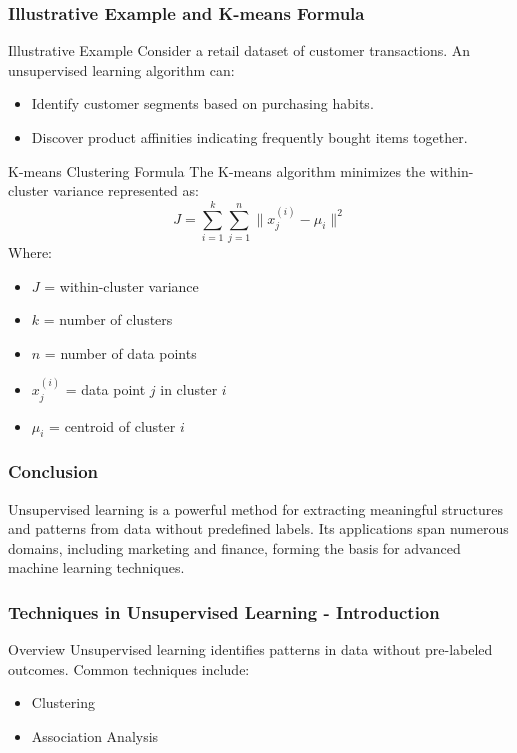 \documentclass[aspectratio=169]{beamer}
\begin{document}
\begin{frame}[fragile]
    \frametitle{Illustrative Example and K-means Formula}
    
    \begin{block}{Illustrative Example}
        Consider a retail dataset of customer transactions. An unsupervised learning algorithm can:
        \begin{itemize}
            \item Identify customer segments based on purchasing habits.
            \item Discover product affinities indicating frequently bought items together.
        \end{itemize}
    \end{block}
    
    \begin{block}{K-means Clustering Formula}
        The K-means algorithm minimizes the within-cluster variance represented as:
        \begin{equation}
        J = \sum_{i=1}^{k} \sum_{j=1}^{n} \|x_j^{(i)} - \mu_i\|^2
        \end{equation}
        Where:
        \begin{itemize}
            \item \(J\) = within-cluster variance
            \item \(k\) = number of clusters
            \item \(n\) = number of data points
            \item \(x_j^{(i)}\) = data point \(j\) in cluster \(i\)
            \item \(\mu_i\) = centroid of cluster \(i\)
        \end{itemize}
    \end{block}
\end{frame}

\begin{frame}[fragile]
    \frametitle{Conclusion}
    
    Unsupervised learning is a powerful method for extracting meaningful structures and patterns from data without predefined labels. 
    Its applications span numerous domains, including marketing and finance, forming the basis for advanced machine learning techniques.
\end{frame}

\begin{frame}[fragile]
    \frametitle{Techniques in Unsupervised Learning - Introduction}
    \begin{block}{Overview}
        Unsupervised learning identifies patterns in data without pre-labeled outcomes. 
        Common techniques include:
    \end{block}
    \begin{itemize}
        \item Clustering
        \item Association Analysis
    \end{itemize}
\end{frame}
\end{document}
